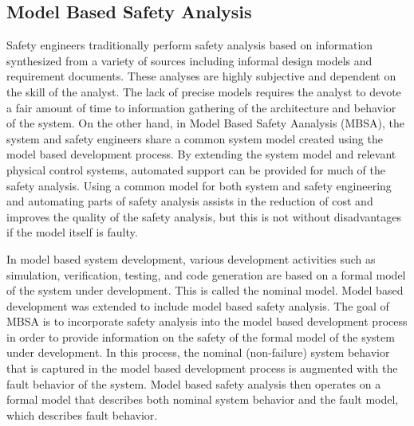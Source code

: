 \subsection{Model Based Safety Analysis}
\label{sec:mbsa}

Safety engineers traditionally perform safety analysis based on information synthesized from a variety of sources including informal design models and requirement documents. These analyses are highly subjective and dependent on the skill of the analyst. The lack of precise models requires the analyst to devote a fair amount of time to information gathering of the architecture and behavior of the system. On the other hand, in Model Based Safety Aanalysis (MBSA), the system and safety engineers share a common system model created using the model based development process. By extending the system model and relevant physical control systems, automated support can be provided for much of the safety analysis. Using a common model for both system and safety engineering and automating parts of safety analysis assists in the reduction of cost and improves the quality of the safety analysis, but this is not without disadvantages if the model itself is faulty. 

In model based system development, various development activities such as simulation, verification, testing, and code generation are based on a formal model of the system under development\cite{Joshi05:Dasc}. This is called the nominal model. Model based development was extended to include model based safety analysis\cite{Joshi05:Dasc,Joshi05:SafeComp,Joshi07:Hase,DBLP:conf/cav/BozzanoCPJKPRT15,CAV2015:BoCiGrMa,info17:HaLuHo}. The goal of MBSA is to incorporate safety analysis into the model based development process in order to provide information on the safety of the formal model of the system under development. In this process, the nominal (non-failure) system behavior that is captured in the model based development process is augmented with the fault behavior of the system. Model based safety analysis then operates on a formal model that describes both nominal system behavior and the fault model, which describes fault behavior. 





